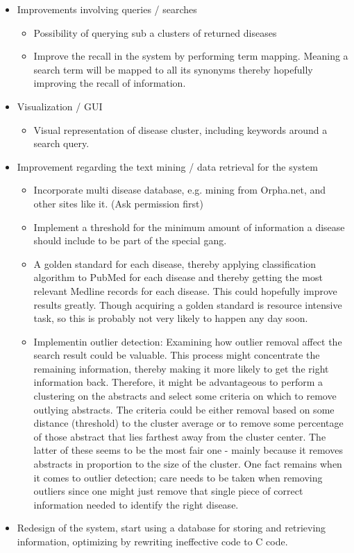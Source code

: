 \begin{itemize}
  \item Improvements involving queries / searches
  \begin{itemize}
    \item Possibility of querying sub a clusters of returned diseases
    \item Improve the recall in the system by performing term mapping. Meaning a search term will be mapped to all its synonyms thereby hopefully improving the recall of information.
  \end{itemize}
  \item Visualization / GUI
  \begin{itemize}
    \item Visual representation of disease cluster, including keywords around a search query.
    
  \end{itemize}
  \item Improvement regarding the text mining / data retrieval for the system
  \begin{itemize}
    \item Incorporate multi disease database, e.g. mining from Orpha.net, and other sites like it. (Ask permission first)
    \item Implement a threshold for the minimum amount of information a disease should include to be part of the special gang.
    \item A golden standard for each disease, thereby applying  classification algorithm to PubMed for each disease and thereby getting the most relevant Medline records for each disease. This could hopefully improve results greatly. Though acquiring a golden standard is resource intensive task, so this is probably not very likely to happen any day soon.
    \item Implementin outlier detection: Examining how outlier removal affect the search result could be valuable. This process might concentrate the remaining information, thereby making it more likely to get the right information back. Therefore, it might be advantageous to perform a clustering on the abstracts and select some criteria on which to remove outlying abstracts. The criteria could be either removal based on some distance (threshold) to the cluster average or to remove some percentage of those abstract that lies farthest away from the cluster center. The latter of these seems to be the most fair one - mainly because it removes abstracts in proportion to the size of the cluster. One fact remains when it comes to outlier detection; care needs to be taken when removing outliers since one might just remove that single piece of correct information needed to identify the right disease.
  \end{itemize}
   \item Redesign of the system, start using a database for storing and retrieving information, optimizing by rewriting ineffective code to C code. 
  
\end{itemize}







